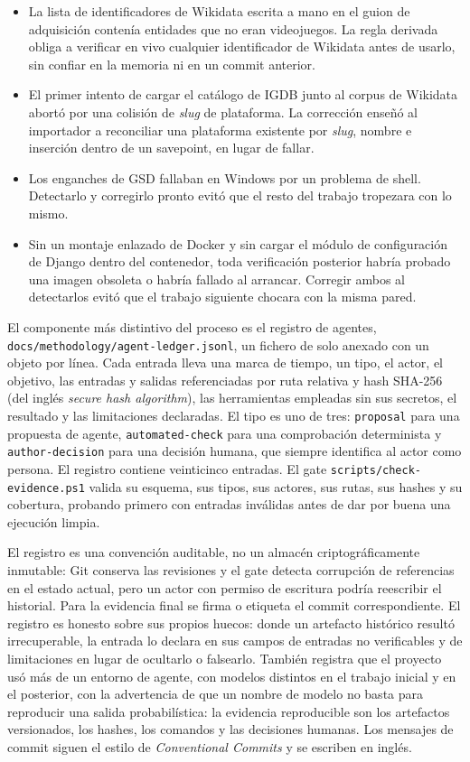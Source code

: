 \begin{itemize}
    \item La lista de identificadores de Wikidata escrita a mano en el guion de adquisición
    contenía entidades que no eran videojuegos. La regla derivada obliga a verificar en vivo
    cualquier identificador de Wikidata antes de usarlo, sin confiar en la memoria ni en un
    commit anterior.
    \item El primer intento de cargar el catálogo de IGDB junto al corpus de Wikidata abortó
    por una colisión de \textit{slug} de plataforma. La corrección enseñó al importador a
    reconciliar una plataforma existente por \textit{slug}, nombre e inserción dentro de un
    savepoint, en lugar de fallar.
    \item Los enganches de GSD fallaban en Windows por un problema de shell. Detectarlo y
    corregirlo pronto evitó que el resto del trabajo tropezara con lo mismo.
    \item Sin un montaje enlazado de Docker y sin cargar el módulo de configuración de Django
    dentro del contenedor, toda verificación posterior habría probado una imagen obsoleta o
    habría fallado al arrancar. Corregir ambos al detectarlos evitó que el trabajo siguiente
    chocara con la misma pared.
\end{itemize}

El componente más distintivo del proceso es el registro de agentes,
\texttt{docs/methodology/agent-ledger.jsonl}, un fichero de solo anexado con un objeto por
línea. Cada entrada lleva una marca de tiempo, un tipo, el actor, el objetivo, las entradas y
salidas referenciadas por ruta relativa y hash SHA-256 (del inglés \textit{secure hash algorithm}), las herramientas empleadas sin sus
secretos, el resultado y las limitaciones declaradas. El tipo es uno de tres:
\texttt{proposal} para una propuesta de agente, \texttt{automated-check} para una
comprobación determinista y \texttt{author-decision} para una decisión humana, que siempre
identifica al actor como persona. El registro contiene veinticinco entradas. El gate
\texttt{scripts/check-evidence.ps1} valida su esquema, sus tipos, sus actores, sus rutas, sus
hashes y su cobertura, probando primero con entradas inválidas antes de dar por buena una
ejecución limpia.

El registro es una convención auditable, no un almacén criptográficamente inmutable: Git
conserva las revisiones y el gate detecta corrupción de referencias en el estado actual, pero
un actor con permiso de escritura podría reescribir el historial. Para la evidencia final se
firma o etiqueta el commit correspondiente. El registro es honesto sobre sus propios huecos:
donde un artefacto histórico resultó irrecuperable, la entrada lo declara en sus campos de
entradas no verificables y de limitaciones en lugar de ocultarlo o falsearlo. También registra
que el proyecto usó más de un entorno de agente, con modelos distintos en el
trabajo inicial y en el posterior, con la advertencia de que un nombre de
modelo no basta para reproducir una salida probabilística: la evidencia reproducible son los
artefactos versionados, los hashes, los comandos y las decisiones humanas.
Los mensajes de commit siguen el estilo de \textit{Conventional Commits} y se escriben en
inglés.

